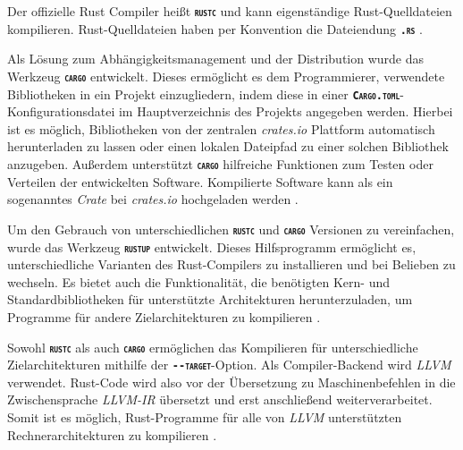 Der offizielle Rust Compiler heißt \texttt{\textsc{\textbf{rustc}}} und kann eigenständige Rust-Quelldateien
kompilieren. Rust-Quelldateien haben per Konvention die Dateiendung \texttt{\textsc{\textbf{.rs}}} \cite{rustBook}.

Als Lösung zum Abhängigkeitsmanagement und der Distribution wurde das Werkzeug \texttt{\textsc{\textbf{cargo}}} 
entwickelt. Dieses ermöglicht es dem Programmierer, verwendete Bibliotheken in ein Projekt einzugliedern,
indem diese in einer \texttt{\textsc{\textbf{Cargo.toml}}}-Konfigurationsdatei im Hauptverzeichnis
des Projekts angegeben werden. Hierbei ist es möglich, Bibliotheken von der zentralen \textit{crates.io}
Plattform automatisch herunterladen zu lassen oder einen lokalen Dateipfad zu einer solchen
Bibliothek anzugeben.
Außerdem unterstützt \texttt{\textsc{\textbf{cargo}}} hilfreiche Funktionen zum Testen oder
Verteilen der entwickelten Software. Kompilierte Software kann als ein sogenanntes \textit{Crate} bei
\textit{crates.io} hochgeladen werden \cite{rustBook}.

Um den Gebrauch von unterschiedlichen \texttt{\textsc{\textbf{rustc}}} und \texttt{\textsc{\textbf{cargo}}} Versionen 
zu vereinfachen, wurde das Werkzeug \texttt{\textsc{\textbf{rustup}}} entwickelt. Dieses
Hilfsprogramm ermöglicht es, unterschiedliche Varianten des Rust-Compilers zu installieren und bei Belieben zu
wechseln. Es bietet auch die Funktionalität, die benötigten Kern- und Standardbibliotheken für unterstützte
Architekturen herunterzuladen, um Programme für andere Zielarchitekturen zu kompilieren \cite{rustupRepo}.

Sowohl \texttt{\textsc{\textbf{rustc}}} als auch \texttt{\textsc{\textbf{cargo}}} ermöglichen das Kompilieren für
unterschiedliche Zielarchitekturen mithilfe der
\texttt{\textsc{\textbf{-{}-target}}}-Option. Als Compiler-Backend wird \textit{LLVM} verwendet.
Rust-Code wird also vor der Übersetzung zu Maschinenbefehlen in die Zwischensprache
\textit{LLVM-IR} übersetzt und erst anschließend weiterverarbeitet.
Somit ist es möglich, Rust-Programme für alle von \textit{LLVM}
unterstützten Rechnerarchitekturen zu kompilieren \cite{rustGPU}.






